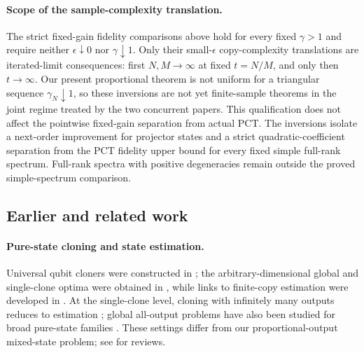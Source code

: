 \documentclass[11pt]{article}
\theoremstyle{remark}
\theoremstyle{plain}
\begin{document}
\paragraph{Scope of the sample-complexity translation.}
The strict fixed-gain fidelity comparisons above hold for every fixed
\(\gamma>1\) and require neither \(\epsilon\downarrow0\) nor
\(\gamma\downarrow1\).  Only their small-\(\epsilon\) copy-complexity
translations are iterated-limit consequences: first \(N,M\to\infty\) at
fixed \(t=N/M\), and only then \(t\to\infty\).  Our present proportional
theorem is not uniform for a triangular sequence \(\gamma_N\downarrow1\),
so these inversions are not yet finite-sample theorems in the joint regime
treated by the two concurrent papers.  This qualification does not affect
the pointwise fixed-gain separation from actual PCT.  The inversions isolate
a next-order improvement for projector states and a strict
quadratic-coefficient separation from the PCT fidelity upper bound for every
fixed simple full-rank spectrum.  Full-rank spectra with positive
degeneracies remain outside the proved simple-spectrum comparison.

\subsection{Earlier and related work}\label{sec:related-work}

\paragraph{Pure-state cloning and state estimation.}
Universal qubit cloners were constructed in
\cite{BuzekHillery1996,GisinMassar1997,
BrussDiVincenzoEkertFuchsMacchiavelloSmolin1998}; the arbitrary-dimensional
global and single-clone optima were obtained in
\cite{Werner1998,KeylWerner1999}, while links to finite-copy estimation were
developed in \cite{MassarPopescu1995,BrussEkertMacchiavello1998}.
At the single-clone level, cloning with infinitely many outputs reduces to
estimation \cite{BaeAcin2006,ChiribellaDAriano2006}; global all-output
problems have also been studied for broad pure-state families
\cite{CheflesBarnett1999,ChiribellaYang2014Optimal,KimChitambar2022}.
These settings differ from our proportional-output mixed-state problem; see
\cite{ScaraniIblisdirGisinAcin2005,FanWangJingYueShiZhangMu2014} for reviews.
\end{document}
